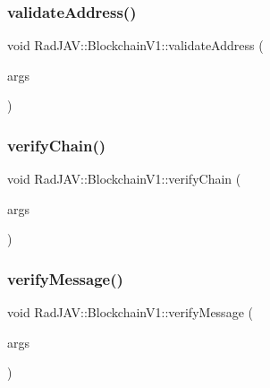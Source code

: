 \subsubsection{\texorpdfstring{validate\+Address()}{validateAddress()}}
{\footnotesize\ttfamily void Rad\+J\+A\+V\+::\+Blockchain\+V1\+::validate\+Address (\begin{DoxyParamCaption}\item[{const v8\+::\+Function\+Callback\+Info$<$ v8\+::\+Value $>$ \&}]{args }\end{DoxyParamCaption})\hspace{0.3cm}{\ttfamily [static]}}

\mbox{\label{class_rad_j_a_v_1_1_blockchain_v1_a3549bbdc5d7cca1c0420919db3bbabc8}} 
\subsubsection{\texorpdfstring{verify\+Chain()}{verifyChain()}}
{\footnotesize\ttfamily void Rad\+J\+A\+V\+::\+Blockchain\+V1\+::verify\+Chain (\begin{DoxyParamCaption}\item[{const v8\+::\+Function\+Callback\+Info$<$ v8\+::\+Value $>$ \&}]{args }\end{DoxyParamCaption})\hspace{0.3cm}{\ttfamily [static]}}

\mbox{\label{class_rad_j_a_v_1_1_blockchain_v1_ae047ae673c04a42d2fb82fe588c253bb}} 
\subsubsection{\texorpdfstring{verify\+Message()}{verifyMessage()}}
{\footnotesize\ttfamily void Rad\+J\+A\+V\+::\+Blockchain\+V1\+::verify\+Message (\begin{DoxyParamCaption}\item[{const v8\+::\+Function\+Callback\+Info$<$ v8\+::\+Value $>$ \&}]{args }\end{DoxyParamCaption})\hspace{0.3cm}{\ttfamily [static]}}

